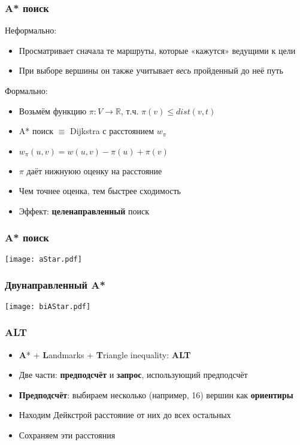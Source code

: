 \documentclass{beamer}
\begin{document}

\begin{frame}
\frametitle{A* поиск}
Неформально:
\begin{itemize}	
  \item Просматривает сначала те маршруты, которые «кажутся» ведущими к цели
  \item При выборе вершины он также учитывает \textit{весь} пройденный до неё путь
\end{itemize}
Формально:
\begin{itemize}	
  \item Возьмём функцию $\pi \colon V \to \mathbb{R}$, т.ч. $\pi(v) \leq dist(v, t)$
  \item A* поиск $\equiv$ Dijkstra с расстоянием $w_\pi$
  \item $w_{\pi}(u,v) = w(u, v) - \pi(u) + \pi(v)$
  \item $\pi$ даёт нижнуюю оценку на расстояние
  \item Чем точнее оценка, тем быстрее сходимость
  \item Эффект: \textbf{целенаправленный} поиск
\end{itemize}
\end{frame}



\begin{frame}
\frametitle{A* поиск}
\texttt{[image: aStar.pdf]}
\end{frame}


\begin{frame}
\frametitle{Двунаправленный A*}
\texttt{[image: biAStar.pdf]}
\end{frame}



\begin{frame}
\frametitle{ALT}
\begin{itemize}	
  \item \textbf{A}* + \textbf{L}andmarks + 	\textbf{T}riangle inequality: \textbf{ALT} \cite{p2} 
  \item Две части: \textbf{предподсчёт} и \textbf{запрос}, использующий предподсчёт
  \item \textbf{Предподсчёт}: выбираем несколько (например, 16) вершин как \textbf{ориентиры}
  \item Находим Дейкстрой расстояние от них до всех остальных
  \item Сохраняем эти расстояния
\end{itemize}
\end{frame}
\end{document}
